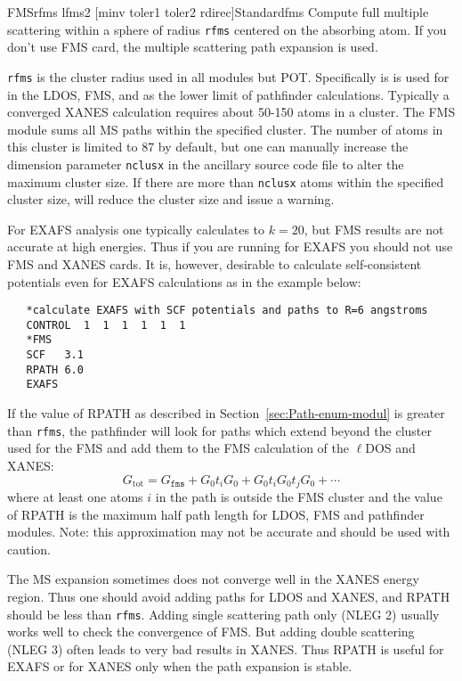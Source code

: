 \documentclass[11pt,oneside]{report} %
\begin{document}
\begin{Card}{FMS}{rfms  lfms2 [minv toler1 toler2 rdirec]}{Standard}{fms}
  Compute full multiple scattering within a sphere of radius
  \texttt{rfms} centered on the absorbing atom.  If you don't use FMS
  card, the multiple scattering path expansion is used.

  \texttt{rfms} is the cluster radius used in all modules but POT.
  Specifically is is used for in the LDOS, FMS, and as the lower limit
  of pathfinder calculations.  Typically a converged XANES calculation requires
  about 50-150 atoms in a cluster.  The FMS module sums all MS paths within
  the specified cluster.  The number of atoms in this
  cluster is limited to 87 by default, but one can manually increase
  the dimension parameter \texttt{nclusx} in the ancillary {\feffcur} source code
  file  to alter the maximum cluster size.  If there are more than
  \texttt{nclusx} atoms within the specified cluster size, {\feff}
  will reduce the cluster size and issue a warning.

  For EXAFS analysis one typically calculates to $k=20$, but FMS results
  are not accurate at high energies.  Thus if you are running
  {\feffcur} for EXAFS you should not use FMS and XANES cards.  It is,
  however, desirable to calculate self-consistent potentials even for
  EXAFS calculations as in the example below:
\begin{verbatim}
   *calculate EXAFS with SCF potentials and paths to R=6 angstroms
   CONTROL  1  1  1  1  1  1
   *FMS
   SCF   3.1
   RPATH 6.0
   EXAFS
\end{verbatim}

  If the value of RPATH as described in
  Section~\ref{sec:Path-enum-modul} is greater than \texttt{rfms}, the
  pathfinder will look for paths which extend beyond the cluster used
  for the FMS and add them to the FMS calculation of the $\ell$DOS and
  XANES:
  $$G_{\mathrm{tot}}=G_{\mathtt{fms}} + G_0t_iG_0 +
  G_0t_iG_0t_jG_0+\cdots$$
  where at least one atoms $i$ in the path is outside the FMS cluster
  and the value of RPATH is the maximum half path length for LDOS, FMS and
  pathfinder modules. Note: this approximation may not be accurate
  and should be used with caution.

  The MS expansion sometimes does not converge well in the XANES energy
  region.  Thus one should avoid adding paths for LDOS and XANES, and
  RPATH should be less than \texttt{rfms}.  Adding single scattering
  path only (NLEG 2) usually works well to check the convergence of
  FMS. But adding double scattering (NLEG 3) often leads to very bad
  results in XANES.  Thus RPATH is useful for EXAFS or for XANES only
  when the path expansion is stable.


\end{Card}
\end{document}
